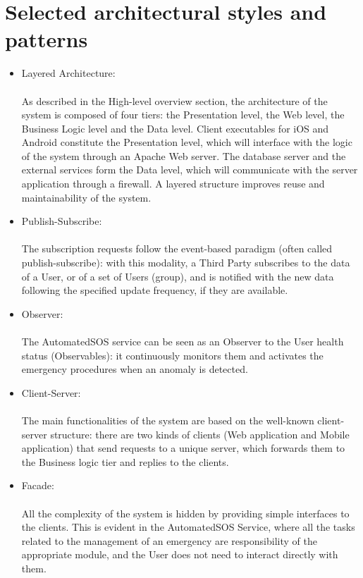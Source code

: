 \section{Selected architectural styles and patterns}

\begin{itemize}
    \item Layered Architecture:\\ \\
    As described in the High-level overview section, the architecture of the system is composed of four tiers: the Presentation level, the Web level, the Business Logic level and the Data level. Client executables for iOS and Android constitute the Presentation level, which will interface with the logic of the system through an Apache Web server. The database server and the external services form the Data level, which will communicate with the server application through a firewall. A layered structure improves reuse and maintainability of the system.
    \item Publish-Subscribe: \\ \\
    The subscription requests follow the event-based paradigm (often called publish-subscribe): with this modality, a Third Party subscribes to the data of a User, or of a set of Users (group), and is notified with the new data following the specified update frequency, if they are available.
    \item Observer: \\ \\
    The AutomatedSOS service can be seen as an Observer to the User health status (Observables): it continuously monitors them and activates the emergency procedures when an anomaly is detected.
    \item Client-Server: \\ \\
    The main functionalities of the system are based on the well-known client-server structure: there are two kinds of clients (Web application and Mobile application) that send requests to a unique server, which forwards them to the Business logic tier and replies to the clients.
    \item Facade: \\ \\
    All the complexity of the system is hidden by providing simple interfaces to the clients. This is evident in the AutomatedSOS Service, where all the tasks related to the management of an emergency are responsibility of the appropriate module, and the User does not need to interact directly with them.
\end{itemize}